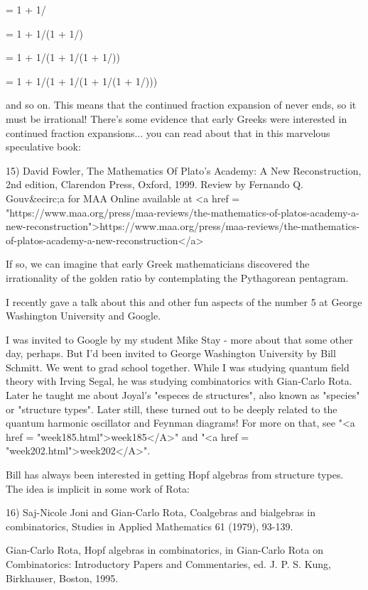 \Phi  = 1 + 1/\Phi  
   

   
    = 1 + 1/(1 + 1/\Phi )


   
    = 1 + 1/(1 + 1/(1 + 1/\Phi ))


   
    = 1 + 1/(1 + 1/(1 + 1/(1 + 1/\Phi )))

and so on.  This means that the continued fraction expansion of
\Phi  never ends, so it must be irrational!  There's some evidence
that early Greeks were interested in continued fraction expansions...
you can read about that in this marvelous speculative book:

15) David Fowler, The Mathematics Of Plato's Academy:
A New Reconstruction, 2nd edition, Clarendon Press, Oxford, 1999.
Review by Fernando Q. Gouv&ecirc;a for MAA Online available at
<a href = "https://www.maa.org/press/maa-reviews/the-mathematics-of-platos-academy-a-new-reconstruction">https://www.maa.org/press/maa-reviews/the-mathematics-of-platos-academy-a-new-reconstruction</a>

If so, we can imagine that early Greek mathematicians discovered
the irrationality of the golden ratio by contemplating the Pythagorean
pentagram.  

I recently gave a talk about this and other fun aspects of the number
5 at George Washington University and Google.  

I was invited to Google by my student Mike Stay - more about that some
other day, perhaps.  But I'd been invited to George Washington
University by Bill Schmitt.  We went to grad school together.  While I
was studying quantum field theory with Irving Segal, he was studying
combinatorics with Gian-Carlo Rota.  Later he taught me about Joyal's
"especes de structures", also known as "species"
or "structure types".  Later still, these turned out to be
deeply related to the quantum harmonic oscillator and Feynman
diagrams!  For more on that, see "<a href =
"week185.html">week185</A>" and "<a href =
"week202.html">week202</A>".

Bill has always been interested in getting Hopf algebras from structure
types.  The idea is implicit in some work of Rota:

16) Saj-Nicole Joni and Gian-Carlo Rota, Coalgebras and bialgebras in 
combinatorics, Studies in Applied Mathematics 61 (1979), 93-139.

Gian-Carlo Rota, Hopf algebras in combinatorics, in Gian-Carlo
Rota on Combinatorics: Introductory Papers and Commentaries, ed.
J. P. S. Kung, Birkhauser, Boston, 1995.

